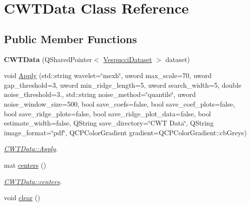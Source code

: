 \hypertarget{class_c_w_t_data}{\section{C\+W\+T\+Data Class Reference}
\label{class_c_w_t_data}
}
\subsection*{Public Member Functions}
\begin{DoxyCompactItemize}
\item 
\hypertarget{class_c_w_t_data_ae3a109688cea3f935d866eb14bdd5040}{{\bfseries C\+W\+T\+Data} (Q\+Shared\+Pointer$<$ \hyperlink{class_vespucci_dataset}{Vespucci\+Dataset} $>$ dataset)}\label{class_c_w_t_data_ae3a109688cea3f935d866eb14bdd5040}

\item 
void \hyperlink{class_c_w_t_data_a2bef5240e7e285a722170a79ec09d326}{Apply} (std\+::string wavelet=\char`\"{}mexh\char`\"{}, uword max\+\_\+scale=70, uword gap\+\_\+threshold=3, uword min\+\_\+ridge\+\_\+length=5, uword search\+\_\+width=5, double noise\+\_\+threshold=3., std\+::string noise\+\_\+method=\char`\"{}quantile\char`\"{}, uword noise\+\_\+window\+\_\+size=500, bool save\+\_\+coefs=false, bool save\+\_\+coef\+\_\+plots=false, bool save\+\_\+ridge\+\_\+plots=false, bool save\+\_\+ridge\+\_\+plot\+\_\+data=false, bool estimate\+\_\+width=false, Q\+String save\+\_\+directory=\char`\"{}C\+W\+T Data\char`\"{}, Q\+String image\+\_\+format=\char`\"{}pdf\char`\"{}, Q\+C\+P\+Color\+Gradient gradient=Q\+C\+P\+Color\+Gradient\+::cb\+Greys)
\begin{DoxyCompactList}\small\item\em \hyperlink{class_c_w_t_data_a2bef5240e7e285a722170a79ec09d326}{C\+W\+T\+Data\+::\+Apply}. \end{DoxyCompactList}\item 
mat \hyperlink{class_c_w_t_data_ad5f5f9db597ab00373481e6067ba75ac}{centers} ()
\begin{DoxyCompactList}\small\item\em \hyperlink{class_c_w_t_data_ad5f5f9db597ab00373481e6067ba75ac}{C\+W\+T\+Data\+::centers}. \end{DoxyCompactList}\item 
\hypertarget{class_c_w_t_data_a95b94433d6244a37cdee0205a67b0321}{void \hyperlink{class_c_w_t_data_a95b94433d6244a37cdee0205a67b0321}{clear} ()}\label{class_c_w_t_data_a95b94433d6244a37cdee0205a67b0321}


\end{DoxyCompactItemize}
